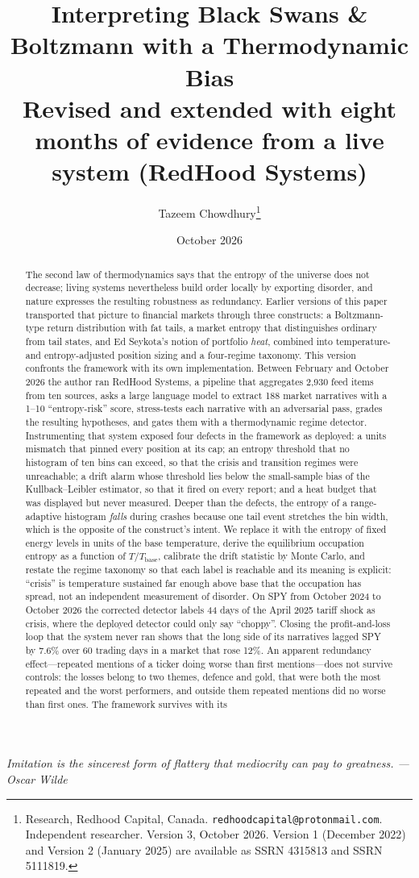 \documentclass[11pt]{article}
\title{Interpreting Black Swans \& Boltzmann with a Thermodynamic Bias\\[4pt]
\large Revised and extended with eight months of evidence from a live system (RedHood Systems)}
\author{Tazeem Chowdhury\thanks{Research, Redhood Capital, Canada. \texttt{redhoodcapital@protonmail.com}. Independent researcher. Version 3, October 2026. Version 1 (December 2022) and Version 2 (January 2025) are available as SSRN 4315813 and SSRN 5111819.}}
\date{October 2026}
\newcommand{\Tb}{T_{\mathrm{base}}}
\begin{document}
\maketitle

\begin{center}\itshape Imitation is the sincerest form of flattery that mediocrity can pay to greatness. --- Oscar Wilde\end{center}

\begin{abstract}
\noindent The second law of thermodynamics says that the entropy of the universe does not decrease; living systems nevertheless build order locally by exporting disorder, and nature expresses the resulting robustness as redundancy. Earlier versions of this paper transported that picture to financial markets through three constructs: a Boltzmann-type return distribution with fat tails, a market entropy that distinguishes ordinary from tail states, and Ed Seykota's notion of portfolio \emph{heat}, combined into temperature- and entropy-adjusted position sizing and a four-regime taxonomy. This version confronts the framework with its own implementation. Between February and October 2026 the author ran RedHood Systems, a pipeline that aggregates 2,930 feed items from ten sources, asks a large language model to extract 188 market narratives with a 1--10 ``entropy-risk'' score, stress-tests each narrative with an adversarial pass, grades the resulting hypotheses, and gates them with a thermodynamic regime detector. Instrumenting that system exposed four defects in the framework as deployed: a units mismatch that pinned every position at its cap; an entropy threshold that no histogram of ten bins can exceed, so that the crisis and transition regimes were unreachable; a drift alarm whose threshold lies below the small-sample bias of the Kullback--Leibler estimator, so that it fired on every report; and a heat budget that was displayed but never measured. Deeper than the defects, the entropy of a range-adaptive histogram \emph{falls} during crashes because one tail event stretches the bin width, which is the opposite of the construct's intent. We replace it with the entropy of fixed energy levels in units of the base temperature, derive the equilibrium occupation entropy as a function of $T/\Tb$, calibrate the drift statistic by Monte Carlo, and restate the regime taxonomy so that each label is reachable and its meaning is explicit: ``crisis'' is temperature sustained far enough above base that the occupation has spread, not an independent measurement of disorder. On SPY from October 2024 to October 2026 the corrected detector labels 44 days of the April 2025 tariff shock as crisis, where the deployed detector could only say ``choppy''. Closing the profit-and-loss loop that the system never ran shows that the long side of its narratives lagged SPY by 7.6\% over 60 trading days in a market that rose 12\%. An apparent redundancy effect---repeated mentions of a ticker doing worse than first mentions---does not survive controls: the losses belong to two themes, defence and gold, that were both the most repeated and the worst performers, and outside them repeated mentions did no worse than first ones. The framework survives with its 
\end{abstract}
\end{document}
